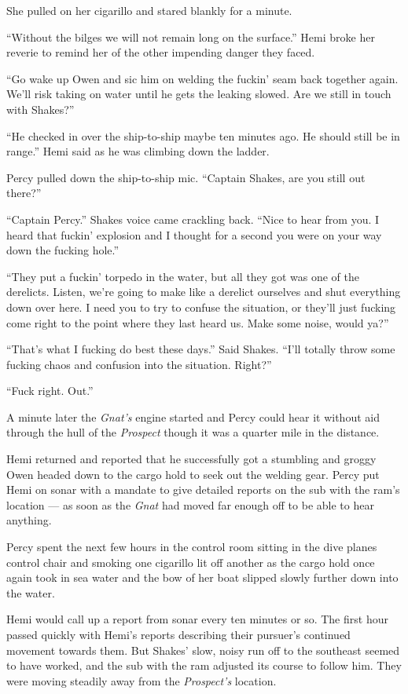 \documentclass[
]{scrbook}
\begin{document}
She pulled on her cigarillo and stared blankly for a minute.

``Without the bilges we will not remain long on the surface.'' Hemi
broke her reverie to remind her of the other impending danger they
faced.

``Go wake up Owen and sic him on welding the fuckin' seam back together
again. We'll risk taking on water until he gets the leaking slowed. Are
we still in touch with Shakes?''

``He checked in over the ship-to-ship maybe ten minutes ago. He should
still be in range.'' Hemi said as he was climbing down the ladder.

Percy pulled down the ship-to-ship mic. ``Captain Shakes, are you still
out there?''

``Captain Percy.'' Shakes voice came crackling back. ``Nice to hear from
you. I heard that fuckin' explosion and I thought for a second you were
on your way down the fucking hole.''

``They put a fuckin' torpedo in the water, but all they got was one of
the derelicts. Listen, we're going to make like a derelict ourselves and
shut everything down over here. I need you to try to confuse the
situation, or they'll just fucking come right to the point where they
last heard us. Make some noise, would ya?''

``That's what I fucking do best these days.'' Said Shakes. ``I'll
totally throw some fucking chaos and confusion into the situation.
Right?''

``Fuck right. Out.''

A minute later the \emph{Gnat's} engine started and Percy could hear it
without aid through the hull of the \emph{Prospect} though it was a
quarter mile in the distance.

Hemi returned and reported that he successfully got a stumbling and
groggy Owen headed down to the cargo hold to seek out the welding gear.
Percy put Hemi on sonar with a mandate to give detailed reports on the
sub with the ram's location --- as soon as the \emph{Gnat} had moved far
enough off to be able to hear anything.

Percy spent the next few hours in the control room sitting in the dive
planes control chair and smoking one cigarillo lit off another as the
cargo hold once again took in sea water and the bow of her boat slipped
slowly further down into the water.

Hemi would call up a report from sonar every ten minutes or so. The
first hour passed quickly with Hemi's reports describing their pursuer's
continued movement towards them. But Shakes' slow, noisy run off to the
southeast seemed to have worked, and the sub with the ram adjusted its
course to follow him. They were moving steadily away from the
\emph{Prospect's} location.
\end{document}
